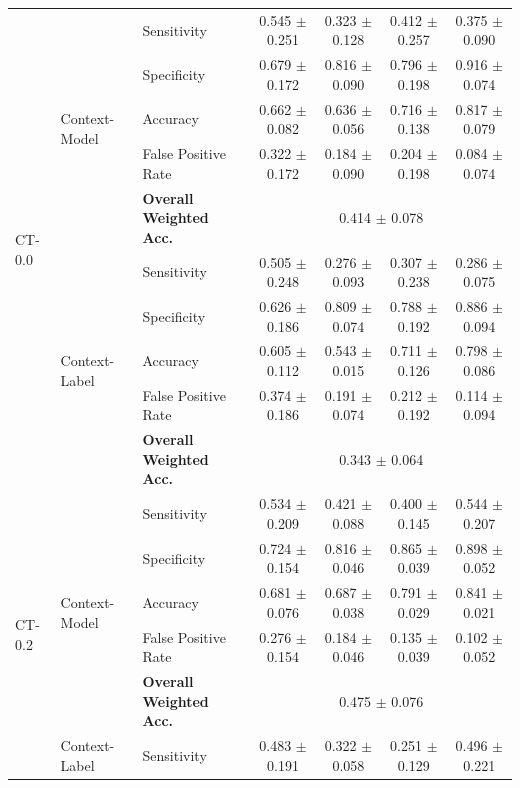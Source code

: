 \begin{table}[ht]
\begin{tabular}{l|llcccc}
\multirow{10}{*}{CT-0.0}
  & \multirow{5}{*}{Context-Model}
      & Sensitivity            & 0.545 $\pm$ 0.251 & 0.323 $\pm$ 0.128 & 0.412 $\pm$ 0.257 & 0.375 $\pm$ 0.090 \\
  &   & Specificity            & 0.679 $\pm$ 0.172 & 0.816 $\pm$ 0.090 & 0.796 $\pm$ 0.198 & 0.916 $\pm$ 0.074 \\
  &   & Accuracy               & 0.662 $\pm$ 0.082 & 0.636 $\pm$ 0.056 & 0.716 $\pm$ 0.138 & 0.817 $\pm$ 0.079 \\
  &   & False Positive Rate    & 0.322 $\pm$ 0.172 & 0.184 $\pm$ 0.090 & 0.204 $\pm$ 0.198 & 0.084 $\pm$ 0.074 \\
  &   & \textbf{Overall Weighted Acc.}
                                & \multicolumn{4}{c}{0.414 $\pm$ 0.078} \\ \cmidrule{2-7}
  & \multirow{5}{*}{Context-Label}
      & Sensitivity            & 0.505 $\pm$ 0.248 & 0.276 $\pm$ 0.093 & 0.307 $\pm$ 0.238 & 0.286 $\pm$ 0.075 \\
  &   & Specificity            & 0.626 $\pm$ 0.186 & 0.809 $\pm$ 0.074 & 0.788 $\pm$ 0.192 & 0.886 $\pm$ 0.094 \\
  &   & Accuracy               & 0.605 $\pm$ 0.112 & 0.543 $\pm$ 0.015 & 0.711 $\pm$ 0.126 & 0.798 $\pm$ 0.086 \\
  &   & False Positive Rate    & 0.374 $\pm$ 0.186 & 0.191 $\pm$ 0.074 & 0.212 $\pm$ 0.192 & 0.114 $\pm$ 0.094 \\
  &   & \textbf{Overall Weighted Acc.}
                                & \multicolumn{4}{c}{0.343 $\pm$ 0.064} \\ \midrule
\multirow{10}{*}{CT-0.2}
  & \multirow{5}{*}{Context-Model}
      & Sensitivity            & 0.534 $\pm$ 0.209 & 0.421 $\pm$ 0.088 & 0.400 $\pm$ 0.145 & 0.544 $\pm$ 0.207 \\
  &   & Specificity            & 0.724 $\pm$ 0.154 & 0.816 $\pm$ 0.046 & 0.865 $\pm$ 0.039 & 0.898 $\pm$ 0.052 \\
  &   & Accuracy               & 0.681 $\pm$ 0.076 & 0.687 $\pm$ 0.038 & 0.791 $\pm$ 0.029 & 0.841 $\pm$ 0.021 \\
  &   & False Positive Rate    & 0.276 $\pm$ 0.154 & 0.184 $\pm$ 0.046 & 0.135 $\pm$ 0.039 & 0.102 $\pm$ 0.052 \\
  &   & \textbf{Overall Weighted Acc.}
                                & \multicolumn{4}{c}{0.475 $\pm$ 0.076} \\ \cmidrule{2-7}
  & \multirow{5}{*}{Context-Label}
      & Sensitivity            & 0.483 $\pm$ 0.191 & 0.322 $\pm$ 0.058 & 0.251 $\pm$ 0.129 & 0.496 $\pm$ 0.221 \\

\end{tabular}
\end{table}
